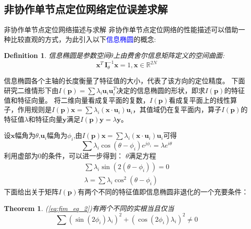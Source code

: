 \documentclass[notheorems,xetex,mathserif,serif]{beamer}
\newtheorem{theorem}{Theorem}
\newtheorem{definition}{Definition}
\begin{document}
\subsection{非协作单节点定位网络定位误差求解}
\begin{frame}{非协作单节点定位网络描述与求解}
非协作单节点定位网络的性能描述可以借助一种比较直观的方式，为此引入以下\textcolor{blue}{信息椭圆}的概念:
\begin{definition}
信息椭圆是参数空间$\theta$上由费舍尔信息矩阵定义的空间曲面:
\begin{equation}\label{eq:ie}
\bm{x}^T\,\bm{I}_{\theta}^{-1}\bm{x}=1,\bm{x}\in \mathbb{R}^{2N}
\end{equation}
\end{definition}
信息椭圆各个主轴的长度衡量了特征值的大小，代表了该方向的定位精度。
下面研究二维情形下由$I(\bm{p})=\sum \lambda_i \bm{u}_i \bm{u}_i^T$决定的信息椭圆的形状，即求$I(\bm{p})$的特征值和特征向量。
将二维向量看成复平面的复数，$I(\bm{p})$看成复平面上的线性算子，作用规则是$I(\bm{p})\bm{x}=\sum \lambda_i (\bm{x}\cdot\bm{u}_i)\bm{u}_i$，其值域仍在复平面内，算子$I(\bm{p})$的特征值$\lambda$和特征向量$\bm{y}$满足$I(\bm{p})\bm{y}=\lambda \bm{y}$。
\end{frame}
\begin{frame}
设$\bm{x}$幅角为$\theta$,$\bm{u}_i$幅角为$\phi_i$,由$I(\bm{p})\bm{x}=\sum \lambda_i (\bm{x}\cdot\bm{u}_i)\bm{u}_i$可得
\begin{equation}
\sum \lambda_i \cos(\theta-\phi_i)e^{j\phi_i}=\lambda e^{i\theta}
\end{equation}
利用虚部为0的条件，可以进一步得到：
$\theta$满足方程
\begin{eqnarray}\label{eq:fim_eq_1}
\sum \lambda_i \sin(2(\theta-\phi_i))=0\\
\lambda=\sum \lambda_i \cos^2(\theta-\phi_i)\label{eq:fim_eq_2}
\end{eqnarray}
下面给出关于矩阵$I(\bm{p})$有两个不同的特征值即信息椭圆非退化的一个充要条件：
\begin{theorem}
(\ref{eq:fim_eq_2})有两个不同的实根当且仅当\[
\sum (\sin(2\phi_i)\lambda_i)^2+(\cos(2\phi_i)\lambda_i)^2 \neq 0\]
\end{theorem}
\end{frame}
\end{document}
